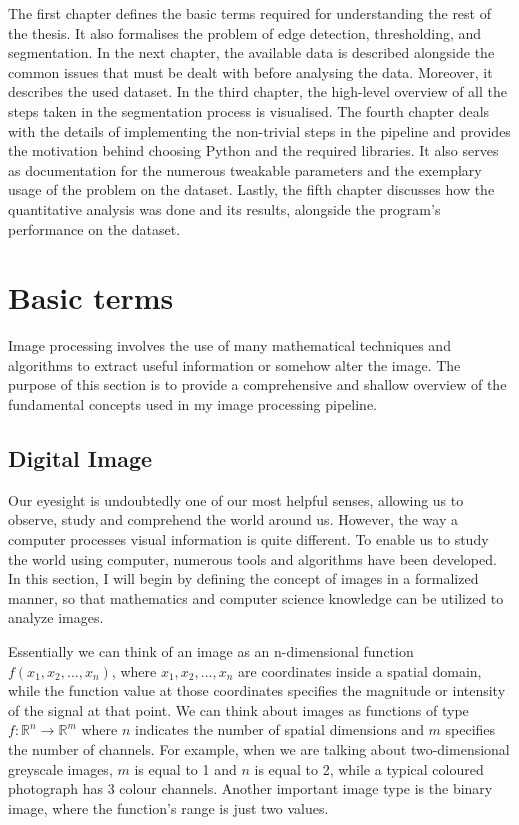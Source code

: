 \documentclass[
  digital,     %
  oneside,     %
  nosansbold,  %
  nocolorbold, %
  lof,         %
  lot,         %
]{fithesis4}
\newcommand*{\R}{\ensuremath{\mathbb{R}}}
\begin{document}
The first chapter defines the basic terms required for understanding the rest of
the thesis. It also formalises the problem of edge detection, thresholding, and
segmentation. In the next chapter, the available data is described alongside the
common issues that must be dealt with before analysing the data. Moreover, it
describes the used dataset. In the third chapter, the high-level overview of all
the steps taken in the segmentation process is visualised. The fourth chapter
deals with the details of implementing the non-trivial steps in the pipeline and
provides the motivation behind choosing Python and the required libraries. It
also serves as documentation for the numerous tweakable parameters and the
exemplary usage of the problem on the dataset. Lastly, the fifth chapter
discusses how the quantitative analysis was done and its results, alongside the
program's performance on the dataset.

\chapter{Basic terms}

Image processing involves the use of many mathematical techniques and algorithms
to extract useful information or somehow alter the image. The purpose of this
section is to provide a comprehensive and shallow overview of the fundamental
concepts used in my image processing pipeline.

\section{Digital Image}
Our eyesight is undoubtedly one of our most helpful senses, allowing us to
observe, study and comprehend the world around us. However, the way a computer
processes visual information is quite different. To enable us to study the world
using computer, numerous tools and algorithms have been developed. In this
section, I will begin by defining the concept of images in a formalized manner,
so that mathematics and computer science knowledge can be utilized to analyze
images.

Essentially we can think of an image as an n-dimensional function $f(x_1, x_2,
..., x_n)$, where $x_1, x_2, ..., x_n$ are coordinates inside a spatial domain,
while the function value at those coordinates specifies the magnitude or
intensity of the signal at that point. We can think about images as functions of
type $f:\R^n \rightarrow \R^m$ where $n$ indicates the number of spatial
dimensions and $m$ specifies the number of channels. For example, when we are
talking about two-dimensional greyscale images, $m$ is equal to 1 and $n$ is
equal to 2, while a typical coloured photograph has 3 colour channels. Another
important image type is the binary image, where the function's range is just two
values.
\end{document}
